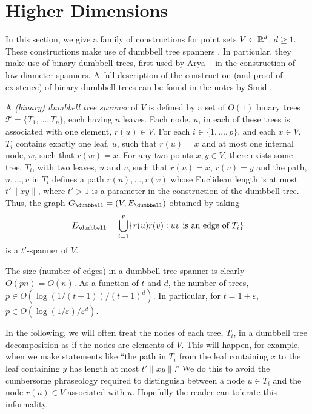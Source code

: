 \documentclass{sig-alternate}
\newcommand{\eps}{\varepsilon}
\begin{document}
\section{Higher Dimensions}

In this section, we give a family of constructions for point sets
$V\subset\mathbb{R}^d$, $d\ge 1$.  These constructions make use of dumbbell
tree spanners \cite[Chapter~11]{ns07}.  In particular, they make use
of binary dumbbell trees, first used by Arya \etal\ \cite{admss95} in
the construction of low-diameter spanners.  A full description of the
construction (and proof of existence) of binary dumbbell trees can be
found in the notes by Smid \cite{s12}.

A \emph{(binary) dumbbell tree spanner} of $V$ is defined by a set of
$O(1)$ binary trees $\mathcal{T}=\{T_1,\ldots,T_p\}$, each having $n$
leaves.  Each node, $u$, in each of these trees is associated with one
element, $r(u)\in V$.  For each $i\in\{1,\ldots,p\}$, and each $x\in V$,
$T_i$ contains exactly one leaf, $u$, such that $r(u)=x$ and at most
one internal node, $w$, such that $r(w)=x$.
For any two points $x,y\in V$, there exists some tree, $T_i$,
with two leaves, $u$ and $v$, such that $r(u)=x$, $r(v)=y$ and
the path, $u,\ldots,v$ in $T_i$ defines a path $r(u),\ldots,r(v)$
whose Euclidean length is at most $t'\|xy\|$, where $t'>1$ is a
parameter in the construction of the dumbbell tree.  Thus, the graph
$G_\dumbbell=(V,E_\dumbbell)$ obtained by taking
\[
   E_\dumbbell = \bigcup_{i=1}^p\{r(u)r(v) : \text{$uv$ is an edge of $T_i$} \}
\]
is a $t'$-spanner of $V$.  

The size (number of edges) in a dumbbell tree spanner is clearly
$O(pn)=O(n)$.  As a function of $t$ and $d$, the number of trees, $p\in O(\log(1/(t-1))/(t-1)^d)$.  In particular, for $t=1+\eps$, $p\in O(\log(1/\eps)/\eps^d)$.


In the following, we will often treat the nodes of each tree, $T_i$,
in a dumbbell tree decomposition as if the nodes are elements of $V$.
This will happen, for example, when we make statements like ``the path in
$T_i$ from the leaf containing $x$ to the leaf containing $y$ has length
at most $t'\|xy\|$.''  We do this to avoid the cumbersome phraseology
required to distinguish between a node $u\in T_i$ and the node $r(u)\in V$
associated with $u$.  Hopefully the reader can tolerate this informality.
\end{document}
